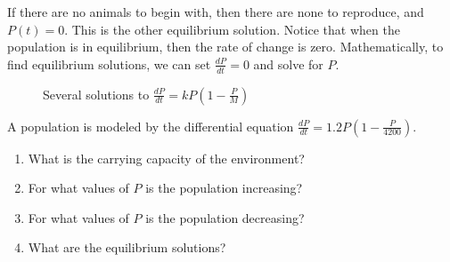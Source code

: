 If there are no animals to begin with, then there are none to reproduce, and 
$P(t) = 0$. This is the other equilibrium solution. Notice that when the 
population is in equilibrium, then the rate of change is zero. Mathematically, 
to find equilibrium solutions, we can set $\frac{dP}{dt} = 0$ and solve for $P$. 

\begin{figure}[htbp]
\centering
    \caption{Several solutions to $\frac{dP}{dt} = kP \left( 1 - \frac{P}{M} 
    \right)$}
    \label{logdiff}
\end{figure}

\begin{Exercise}[label = logdiff1]
A population is modeled by the differential equation $\frac{dP}{dt} = 1.2P 
\left( 1 - \frac{P}{4200} \right)$.
\begin{enumerate}
\item What is the carrying capacity of the environment?
\item For what values of $P$ is the population increasing?
\item For what values of $P$ is the population decreasing?
\item What are the equilibrium solutions?
\end{enumerate}
\end{Exercise}

